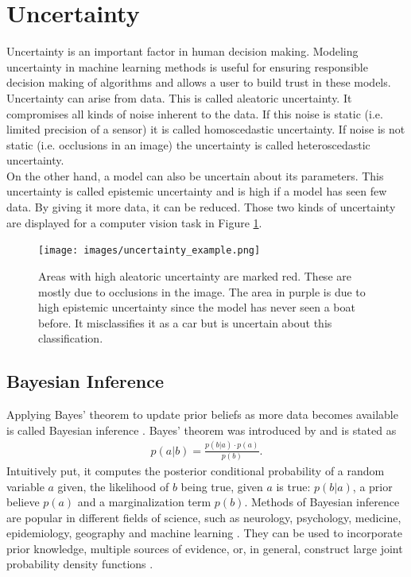 \documentclass[a4paper,cleardoubleempty,BCOR1cm, 11pt]{report}
\begin{document}
\section{Uncertainty}
Uncertainty is an important factor in human decision making. Modeling uncertainty in machine learning methods is useful for ensuring responsible decision making of algorithms and allows a user to build trust in these models. Uncertainty can arise from data. This is called aleatoric uncertainty. It compromises all kinds of noise inherent to the data. If this noise is static (i.e. limited precision of a sensor) it is called homoscedastic uncertainty. If noise is not static (i.e. occlusions in an image) the uncertainty is called heteroscedastic uncertainty.\\
On the other hand, a model can also be uncertain about its parameters. This uncertainty is called epistemic uncertainty and is high if a model has seen few data. By giving it more data, it can be reduced. Those two kinds of uncertainty are displayed for a computer vision task in Figure \ref{fig:uncertainty_example}.
\begin{figure}
	\centering
	\texttt{[image: images/uncertainty\_example.png]} 
	\caption{Areas with high aleatoric uncertainty are marked red. These are mostly due to occlusions in the image. The area in purple is due to high epistemic uncertainty since the model has never seen a boat before. It misclassifies it as a car but is uncertain about this classification.}
	\label{fig:uncertainty_example}
\end{figure}


\subsection{Bayesian Inference}
Applying Bayes' theorem to update prior beliefs as more data becomes available is called Bayesian inference \cite{box2011bayesian}. Bayes' theorem was introduced by \citet{bayes1763lii} and is stated as
\begin{align*}
	p(a|b) = \frac{p(b|a) \cdot p(a)}{p(b)}.
\end{align*}
Intuitively put, it computes the posterior conditional probability of a random variable $a$ given, the likelihood of $b$ being true, given $a$ is true: $p(b|a)$, a prior believe $p(a)$ and a marginalization term $p(b)$. Methods of Bayesian inference are popular in different fields of science, such as neurology, psychology, medicine, epidemiology, geography and machine learning \cite{friston2002classical,wagenmakers2018bayesian,koch2006bayesian,parmigiani2002modeling,didelot2014bayesian,ghahramani2015probabilistic}. They can be used to incorporate prior knowledge, multiple sources of evidence, or, in general, construct large joint probability density functions \cite{Spiegelhalter:2009}.
\end{document}
